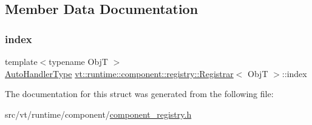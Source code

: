\subsection{Member Data Documentation}
\mbox{\label{structvt_1_1runtime_1_1component_1_1registry_1_1_registrar_a7dfbeea6d73d4baed5c94abfdd172cc6}} 
\subsubsection{\texorpdfstring{index}{index}}
{\footnotesize\ttfamily template$<$typename ObjT $>$ \\
\hyperlink{namespacevt_1_1runtime_1_1component_1_1registry_a9b86518797c7bb91babf0ca8ee7d06e6}{Auto\+Handler\+Type} \hyperlink{structvt_1_1runtime_1_1component_1_1registry_1_1_registrar}{vt\+::runtime\+::component\+::registry\+::\+Registrar}$<$ ObjT $>$\+::index}



The documentation for this struct was generated from the following file\+:\begin{DoxyCompactItemize}
\item 
src/vt/runtime/component/\hyperlink{component__registry_8h}{component\+\_\+registry.\+h}\end{DoxyCompactItemize}

